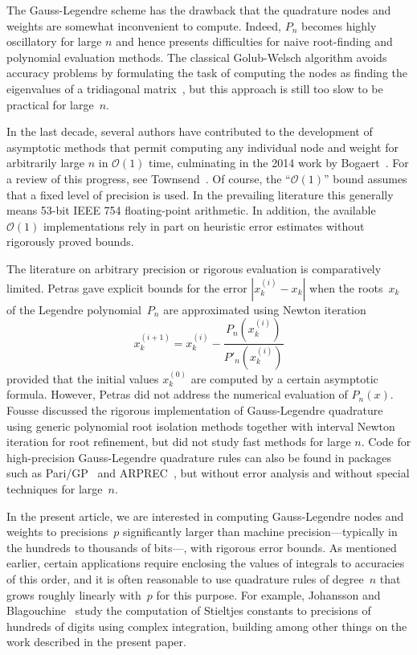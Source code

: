 \documentclass[nohypdvips,review]{siamart0216}
\newcommand{\OO}{\mathcal{O}}
\begin{document}
The Gauss-Legendre scheme has the drawback
that the quadrature nodes and weights are
somewhat inconvenient to compute.
Indeed, $P_n$ becomes highly oscillatory for
large $n$ and hence presents difficulties
for naive root-finding and polynomial evaluation methods.
The classical Golub-Welsch algorithm avoids accuracy problems
by formulating the task of computing the nodes as
finding the eigenvalues of a tridiagonal matrix~\cite{golub1969calculation},
but this approach is still too slow to be practical for large~$n$.

In the last decade, several authors have contributed to
the development of asymptotic methods
that permit computing any individual node and weight for arbitrarily large $n$
in $\OO(1)$ time, culminating in the 2014 work by
Bogaert~\cite{Bogaert2012,hale2013fast,bogaert2014iteration}.
For a review of this progress, see Townsend~\cite{townsend2015race}.
Of course, the ``$\OO(1)$'' bound assumes that a fixed
level of precision is used. In the prevailing literature
this generally means 53-bit IEEE 754 floating-point arithmetic.
In addition, the available $\OO(1)$ implementations rely in part
on heuristic error estimates without rigorously proved bounds.

The literature on arbitrary precision or rigorous evaluation
is comparatively limited.
Petras \cite{petras1999computation} gave explicit
bounds for the error $|x_k^{(i)} - x_k|$ when
the roots $x_k$ of the Legendre polynomial $P_n$
are approximated using Newton iteration
\begin{equation}
\label{eq:newton}
x^{(i+1)}_k = x^{(i)}_k - \frac{P_n(x^{(i)}_k)}{P'_n(x^{(i)}_k)}
\end{equation}
provided that the initial values $x^{(0)}_k$
are computed by a certain asymptotic formula.
However, Petras did not address the numerical evaluation of $P_n(x)$.
Fousse \cite{fousse2007accurate} discussed the rigorous implementation
of Gauss-Legendre quadrature
using generic polynomial root isolation methods together with
interval Newton iteration
for root refinement,
but did not study fast methods for large $n$.
Code for high-precision Gauss-Legendre quadrature rules can also be found
in packages such as Pari/GP~\cite{PARI2}
and ARPREC~\cite{bailey2002arprec}, but without error analysis
and without special techniques for large~$n$.

In the present article, we are interested in computing Gauss-Legendre
nodes and weights to precisions~$p$ significantly larger than machine
precision---typically in the hundreds to thousands of bits---, with
rigorous error bounds.
As mentioned earlier, certain applications require enclosing the values
of integrals to accuracies of this order,
and it is often reasonable to use quadrature rules of degree~$n$ that
grows roughly linearly with~$p$ for this purpose.
For example, Johansson and Blagouchine~\cite{Johansson2018a}
study the computation of Stieltjes constants to precisions
of hundreds of digits using complex integration, building among
other things on the work described in the present paper.
\end{document}
